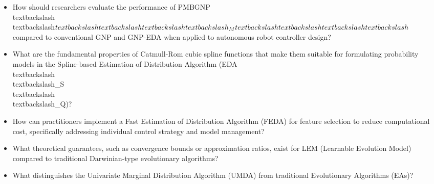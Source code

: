 \begin{itemize}[noitemsep]
    \item How should researchers evaluate the performance of PMBGNP\\textbackslash{}\\textbackslash{}$\\textbackslash{}\\textbackslash{}{\\textbackslash{}\\textbackslash{}_M\\textbackslash{}\\textbackslash{}}\\textbackslash{}\\textbackslash{}$ compared to conventional GNP and GNP-EDA when applied to autonomous robot controller design?
    \item What are the fundamental properties of Catmull-Rom cubic spline functions that make them suitable for formulating probability models in the Spline-based Estimation of Distribution Algorithm (EDA\\textbackslash{}\\textbackslash{}_S\\textbackslash{}\\textbackslash{}_Q)?
    \item How can practitioners implement a Fast Estimation of Distribution Algorithm (FEDA) for feature selection to reduce computational cost, specifically addressing individual control strategy and model management?
    \item What theoretical guarantees, such as convergence bounds or approximation ratios, exist for LEM (Learnable Evolution Model) compared to traditional Darwinian-type evolutionary algorithms?
    \item What distinguishes the Univariate Marginal Distribution Algorithm (UMDA) from traditional Evolutionary Algorithms (EAs)?
\end{itemize}
